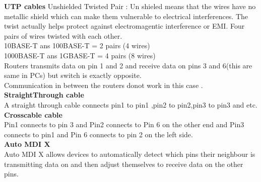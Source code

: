 \documentclass{report}
\begin{document}
	\textbf{UTP cables } Unshielded Twisted Pair : Un shieled means that the wires
	have no metallic shield which can make them vulnerable to electrical interferences.
	The twist actually helps protect against electromagentic interference or EMI. Four
	pairs of wires twisted with each other.\\ 10BASE-T ans 100BASE-T = 2 pairs (4
	wires)\\ 1000BASE-T ans 1GBASE-T = 4 pairs (8 wires)\\ Routers transmits data on
	pin 1 and 2 and receive data on pins 3 and 6(this are same in PCs) but switch
	is exactly opposite.\\ Communication in between the routers donot work in this
	case .\\ \textbf{StraightThrough cable}\\ A straight through cable connects pin1
	to pin1 ,pin2 to pin2,pin3 to pin3 and etc.\\ \textbf{Crosscable cable}\\ Pin1
	connects to pin 3 and Pin2 connects to Pin 6 on the other end and Pin3
	connects to pin1 and Pin 6 connects to pin 2 on the left side.\\ \textbf{Auto
	MDI X}\\ Auto MDI X allows devices to automatically detect which pins their
	neighbour is transmitting data on and then adjust themselves to receive data
	on the other pins.\\
\end{document}
